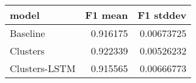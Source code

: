 \begin{tabular}{lrr}
\toprule
 model         &   F1 mean &   F1 stddev \\
\midrule
 Baseline      &  0.916175 &  0.00673725 \\
 Clusters      &  0.922339 &  0.00526232 \\
 Clusters-LSTM &  0.915565 &  0.00666773 \\
\bottomrule
\end{tabular}